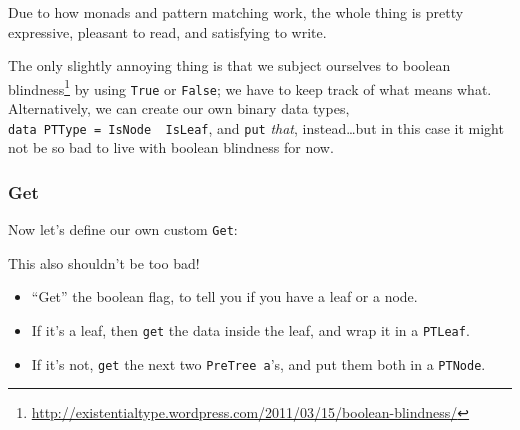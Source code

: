 \documentclass[]{article}
\newenvironment{Shaded}{}{}
\newcommand{\CommentTok}[1]{\textcolor[rgb]{0.38,0.63,0.69}{\textit{#1}}}
\newcommand{\DataTypeTok}[1]{\textcolor[rgb]{0.56,0.13,0.00}{#1}}
\newcommand{\KeywordTok}[1]{\textcolor[rgb]{0.00,0.44,0.13}{\textbf{#1}}}
\newcommand{\NormalTok}[1]{#1}
\newcommand{\OperatorTok}[1]{\textcolor[rgb]{0.40,0.40,0.40}{#1}}
\newcommand{\OtherTok}[1]{\textcolor[rgb]{0.00,0.44,0.13}{#1}}
\renewcommand{\href}[2]{#2\footnote{\url{#1}}}
\begin{document}
Due to how monads and pattern matching work, the whole thing is pretty
expressive, pleasant to read, and satisfying to write.

The only slightly annoying thing is that we subject ourselves to
\href{http://existentialtype.wordpress.com/2011/03/15/boolean-blindness/}{boolean
blindness} by using \texttt{True} or \texttt{False}; we have to keep track of
what means what. Alternatively, we can create our own binary data types,
\texttt{data\ PTType\ =\ IsNode\ \textbar{}\ IsLeaf}, and \texttt{put}
\emph{that}, instead\ldots but in this case it might not be so bad to live with
boolean blindness for now.

\subsubsection{Get}\label{get}

Now let's define our own custom \texttt{Get}:

\begin{Shaded}
\end{Shaded}

This also shouldn't be too bad!

\begin{itemize}
\tightlist
\item
  ``Get'' the boolean flag, to tell you if you have a leaf or a node.
\item
  If it's a leaf, then \texttt{get} the data inside the leaf, and wrap it in a
  \texttt{PTLeaf}.
\item
  If it's not, \texttt{get} the next two \texttt{PreTree\ a}'s, and put them
  both in a \texttt{PTNode}.
\end{itemize}
\end{document}
